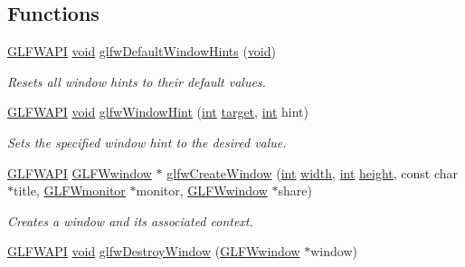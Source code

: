 \subsection*{Functions}
\begin{DoxyCompactItemize}
\item 
\hyperlink{glfw3_8h_a56da5036b2cc259351ae22fd6439bb47}{G\-L\-F\-W\-A\-P\-I} \hyperlink{wglew_8h_aeea6e3dfae3acf232096f57d2d57f084}{void} \hyperlink{group__window_ga8050ddceed9dc6bd9d3aa35666195cd4}{glfw\-Default\-Window\-Hints} (\hyperlink{wglew_8h_aeea6e3dfae3acf232096f57d2d57f084}{void})
\begin{DoxyCompactList}\small\item\em Resets all window hints to their default values. \end{DoxyCompactList}\item 
\hyperlink{glfw3_8h_a56da5036b2cc259351ae22fd6439bb47}{G\-L\-F\-W\-A\-P\-I} \hyperlink{wglew_8h_aeea6e3dfae3acf232096f57d2d57f084}{void} \hyperlink{group__window_gab6e60483d79175b868d6d4dc1dcc63e2}{glfw\-Window\-Hint} (\hyperlink{wglew_8h_a500a82aecba06f4550f6849b8099ca21}{int} \hyperlink{glew_8h_aa43eab0fe80422366a4602998d53b133}{target}, \hyperlink{wglew_8h_a500a82aecba06f4550f6849b8099ca21}{int} hint)
\begin{DoxyCompactList}\small\item\em Sets the specified window hint to the desired value. \end{DoxyCompactList}\item 
\hyperlink{glfw3_8h_a56da5036b2cc259351ae22fd6439bb47}{G\-L\-F\-W\-A\-P\-I} \hyperlink{group__window_ga3c96d80d363e67d13a41b5d1821f3242}{G\-L\-F\-Wwindow} $\ast$ \hyperlink{group__window_ga680a02abe0e4494b6759d5703240713e}{glfw\-Create\-Window} (\hyperlink{wglew_8h_a500a82aecba06f4550f6849b8099ca21}{int} \hyperlink{glew_8h_aa105b18f96e6bc2485cb7f576a7fb9ba}{width}, \hyperlink{wglew_8h_a500a82aecba06f4550f6849b8099ca21}{int} \hyperlink{glew_8h_aa214bd63e12f7ddf524c83894fcc69a7}{height}, const char $\ast$title, \hyperlink{group__monitor_ga8d9efd1cde9426692c73fe40437d0ae3}{G\-L\-F\-Wmonitor} $\ast$monitor, \hyperlink{group__window_ga3c96d80d363e67d13a41b5d1821f3242}{G\-L\-F\-Wwindow} $\ast$share)
\begin{DoxyCompactList}\small\item\em Creates a window and its associated context. \end{DoxyCompactList}\item 
\hyperlink{glfw3_8h_a56da5036b2cc259351ae22fd6439bb47}{G\-L\-F\-W\-A\-P\-I} \hyperlink{wglew_8h_aeea6e3dfae3acf232096f57d2d57f084}{void} \hyperlink{group__window_ga806747476b7247d292be3711c323ea10}{glfw\-Destroy\-Window} (\hyperlink{group__window_ga3c96d80d363e67d13a41b5d1821f3242}{G\-L\-F\-Wwindow} $\ast$window)

\end{DoxyCompactItemize}
